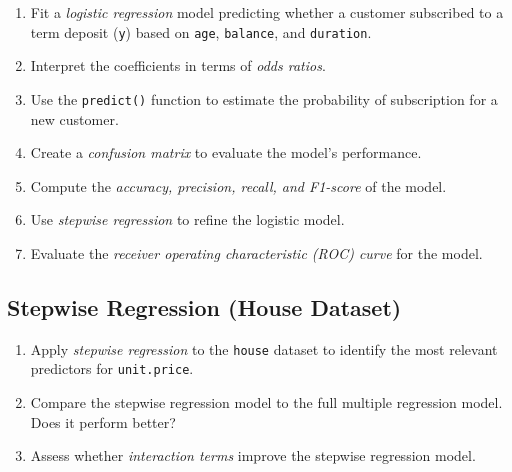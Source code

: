 \documentclass[
  11pt,
]{book}
\newcommand{\passthrough}[1]{#1}
\providecommand{\tightlist}{%
  \setlength{\itemsep}{0pt}\setlength{\parskip}{0pt}}
\theoremstyle{definition}
\theoremstyle{definition}
\theoremstyle{definition}
\theoremstyle{definition}
\theoremstyle{remark}
\begin{document}
\begin{enumerate}
\def\labelenumi{\arabic{enumi}.}
\setcounter{enumi}{39}
\tightlist
\item
  Fit a \emph{logistic regression} model predicting whether a customer subscribed to a term deposit (\passthrough{\lstinline!y!}) based on \passthrough{\lstinline!age!}, \passthrough{\lstinline!balance!}, and \passthrough{\lstinline!duration!}.\\
\item
  Interpret the coefficients in terms of \emph{odds ratios}.\\
\item
  Use the \passthrough{\lstinline!predict()!} function to estimate the probability of subscription for a new customer.\\
\item
  Create a \emph{confusion matrix} to evaluate the model's performance.\\
\item
  Compute the \emph{accuracy, precision, recall, and F1-score} of the model.\\
\item
  Use \emph{stepwise regression} to refine the logistic model.\\
\item
  Evaluate the \emph{receiver operating characteristic (ROC) curve} for the model.
\end{enumerate}

\subsection*{Stepwise Regression (House Dataset)}\label{stepwise-regression-house-dataset}


\begin{enumerate}
\def\labelenumi{\arabic{enumi}.}
\setcounter{enumi}{46}
\tightlist
\item
  Apply \emph{stepwise regression} to the \passthrough{\lstinline!house!} dataset to identify the most relevant predictors for \passthrough{\lstinline!unit.price!}.\\
\item
  Compare the stepwise regression model to the full multiple regression model. Does it perform better?\\
\item
  Assess whether \emph{interaction terms} improve the stepwise regression model.
\end{enumerate}
\end{document}
